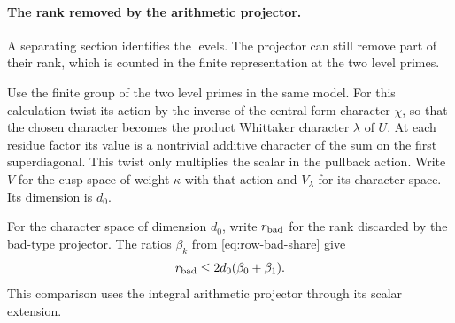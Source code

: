 \paragraph{The rank removed by the arithmetic projector.}

A separating section identifies the levels. The projector can still remove part of their rank, which is counted in the finite representation at the two level primes.

Use the finite group of the two level primes in the same model.
For this calculation twist its action by the inverse of the
central form character $\chi$, so that the chosen character
becomes the product Whittaker character $\lambda$ of $U$. At
each residue factor its value is a nontrivial additive character
of the sum on the first superdiagonal. This twist only multiplies
the scalar in the pullback action. Write $V$ for the cusp space
of weight $\kappa$ with that action and $V_\lambda$ for its
character space. Its dimension is $d_0$.

\begin{lemma}
\label{lem:paired-projector-rank-loss}
For the character space of dimension \(d_0\), write \(r_{\rm bad}\) for the rank discarded by the bad-type projector. The ratios \(\beta_k\) from \eqref{eq:row-bad-share} give
\[
 r_{\rm bad}\le2d_0(\beta_0+\beta_1).
\]
 This comparison uses the integral
arithmetic projector through its scalar extension.
\end{lemma}

